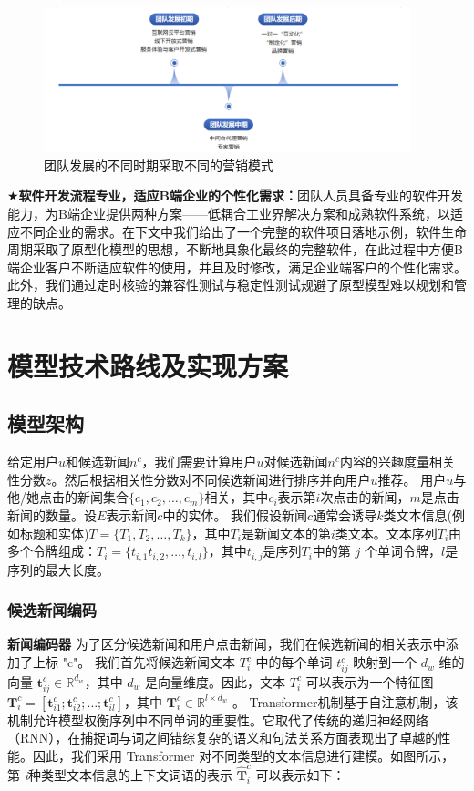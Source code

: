 \documentclass[withoutpreface,bwprint]{cumcmthesis} %
\begin{document}
	\begin{figure}[H]
		\includegraphics[width=0.95\textwidth]{营销发展}
		\caption{团队发展的不同时期采取不同的营销模式}
		\label{fig:circuit-diagcam}
	\end{figure}
	$\bigstar$\textbf{软件开发流程专业，适应B端企业的个性化需求：}团队人员具备专业的软件开发能力，为B端企业提供两种方案——低耦合工业界解决方案和成熟软件系统，以适应不同企业的需求。在下文中我们给出了一个完整的软件项目落地示例，软件生命周期采取了原型化模型的思想，不断地具象化最终的完整软件，在此过程中方便B端企业客户不断适应软件的使用，并且及时修改，满足企业端客户的个性化需求。此外，我们通过定时核验的兼容性测试与稳定性测试规避了原型模型难以规划和管理的缺点。\par
	\newpage
	\section{模型技术路线及实现方案}
	\subsection{模型架构}
	给定用户$u$和候选新闻$n^c$，我们需要计算用户$u$对候选新闻$n^c$内容的兴趣度量相关性分数$z$。然后根据相关性分数对不同候选新闻进行排序并向用户$u$推荐。
	用户$u$与他/她点击的新闻集合$\{ c_1, c_2, \dots, c_m\} $相关，其中$c_i$表示第$i$次点击的新闻，$m$是点击新闻的数量。设$E$表示新闻$c$中的实体。
	我们假设新闻$c$通常会诱导$k$类文本信息(例如标题和实体)$T = \{ T_1, T_2,\dots, T_k\} $，其中$T_i$是新闻文本的第$i$类文本。文本序列$T_i$由多个令牌组成：$T_i = \{ t_{ i,1}  t_{ i,2}  ,\dots, t_{ i,l} \} $，其中$t_{ i,j} $是序列$T_i$中的第{ $j$} 个单词令牌，$l$是序列的最大长度。
	\subsubsection{ 候选新闻编码}
	\textbf{新闻编码器 } 
	为了区分候选新闻和用户点击新闻，我们在候选新闻的相关表示中添加了上标 "c"。
	我们首先将候选新闻文本 $T_i^c$ 中的每个单词 $t^c_{ij}$ 映射到一个 $d_w$ 维的向量 $\mathbf{t}_{ij}^c \in \mathbb{R}^{d_w}$，其中 $d_w$ 是向量维度。因此，文本 $T_i^c$ 可以表示为一个特征图 $\mathbf{T}_i^c = [\mathbf{t}_{i1}^c; \mathbf{t}_{i2}^c; \dots; \mathbf{t}_{il}^c]$，其中 $\mathbf{T}_i^c \in \mathbb{R}^{l \times d_w}$ 。
	Transformer机制基于自注意机制，该机制允许模型权衡序列中不同单词的重要性。它取代了传统的递归神经网络（RNN），在捕捉词与词之间错综复杂的语义和句法关系方面表现出了卓越的性能。因此，我们采用 Transformer 对不同类型的文本信息进行建模。如图所示，第 \textit{i}种类型文本信息的上下文词语的表示 $\hat{\mathbf{T}}_i^c$ 可以表示如下：
	
\end{document}
